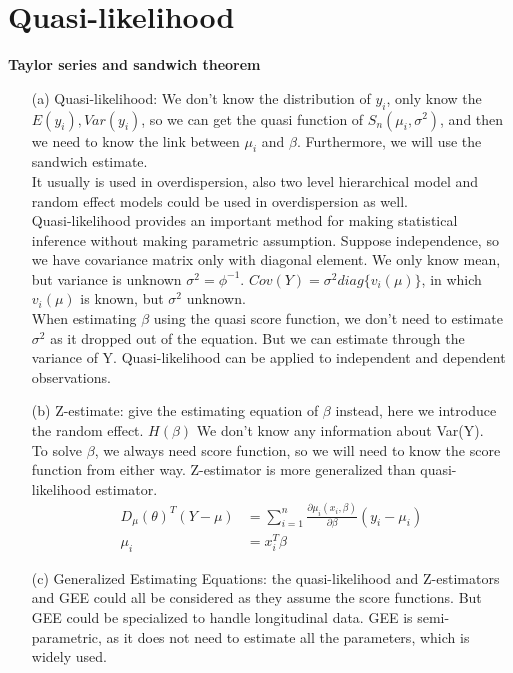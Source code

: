 
 \section{Quasi-likelihood}
 
 \textbf{Taylor series and sandwich theorem}
 
 \begin{itemize}
     \item [(a)] Quasi-likelihood: We don't know the distribution of $y_i$, only know the $E(y_i), Var(y_i)$, so we can get the quasi function of $S_n(\mu_i, \sigma^2)$, and then we need to know the link between $\mu_i$ and $\beta$. Furthermore, we will use the sandwich estimate.\\
     It usually is used in overdispersion, also two level hierarchical model and random effect models could be used in overdispersion as well.\\
     Quasi-likelihood provides an important method for making statistical inference without making parametric assumption. Suppose independence, so we have covariance matrix only with diagonal element. We only know mean, but variance is unknown $\sigma^2 = \phi^{-1}$. $Cov(Y) =  \sigma^2 diag\{v_i(\mu)\}$, in which $v_i(\mu)$ is known, but $\sigma^2$ unknown.\\
     When estimating $\beta$ using the quasi score function, we don't need to estimate $\sigma^2$ as it dropped out of the equation. But we can estimate through the variance of Y. 
Quasi-likelihood can be applied to independent and dependent observations.\\
     
     \item[(b)]  Z-estimate: give the estimating equation of $\beta$ instead, here we introduce the random effect. $H(\beta)$ We don't know any information about Var(Y).\\
 To solve $\beta$, we always need score function, so we will need to know the score function from either way. Z-estimator is more generalized than quasi-likelihood estimator. \\
 \begin{align*}
    D_{\mu}(\theta)^T (Y-\mu) &= \sum_{i=1}^n \frac{\partial \mu_i(x_i, \beta)}{\partial \beta} (y_i-\mu_i)\\
    \mu_i &= x_i^T \beta
\end{align*}
 \item[(c)] Generalized Estimating Equations: the quasi-likelihood and Z-estimators and GEE could all be considered as they assume the score functions. But GEE could be specialized to handle longitudinal data. GEE is semi-parametric, as it does not need to estimate all the parameters, which is widely used. \\
 \end{itemize}

